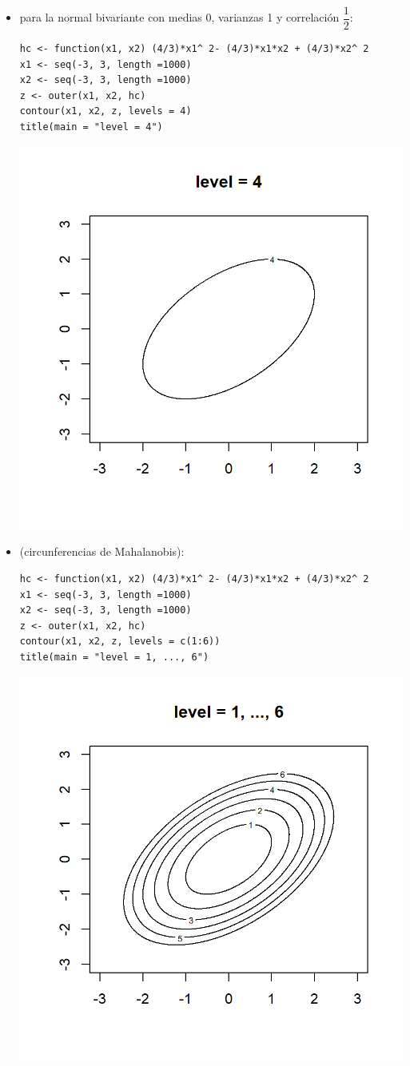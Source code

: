 \begin{itemize}
	\item {} para la normal bivariante con medias 0, varianzas 1 y correlación $\dfrac{1}{2}:$
	
	\begin{lstlisting}
hc <- function(x1, x2) (4/3)*x1^ 2- (4/3)*x1*x2 + (4/3)*x2^ 2
x1 <- seq(-3, 3, length =1000)
x2 <- seq(-3, 3, length =1000)
z <- outer(x1, x2, hc)
contour(x1, x2, z, levels = 4)
title(main = "level = 4")
	\end{lstlisting}
	\begin{center}
		\includegraphics[width=0.5\linewidth]{"Temas/Imágenes/Tema 4/screenshot001"}
	\end{center}
	\item {} (circunferencias de Mahalanobis):
	\begin{lstlisting}
hc <- function(x1, x2) (4/3)*x1^ 2- (4/3)*x1*x2 + (4/3)*x2^ 2
x1 <- seq(-3, 3, length =1000)
x2 <- seq(-3, 3, length =1000)
z <- outer(x1, x2, hc)
contour(x1, x2, z, levels = c(1:6))
title(main = "level = 1, ..., 6")
	\end{lstlisting}
	\begin{center}
		\includegraphics[width=0.5\linewidth]{"Temas/Imágenes/Tema 4/screenshot002"}
	\end{center}
\end{itemize}

